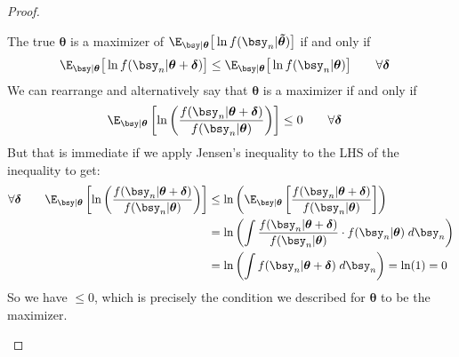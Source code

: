 \documentclass[12pt]{article}
\theoremstyle{plain}
\theoremstyle{definition}
\theoremstyle{remark}
\newcommand{\bstheta}{\boldsymbol{\theta}}
\newcommand{\bsdelta}{\boldsymbol{\delta}}
\newcommand{\bstildetheta}{\boldsymbol{\tilde{\theta}}}
\begin{document}
\begin{proof}
\begin{enumerate}[label=(\roman*)]
    The true $\bstheta$ is a maximizer of
    $\E_{\bsy|\bstheta}\big[\ln f(\bsy_n|\bstildetheta)\big]$ if and
    only if
    \begin{align*}
      \E_{\bsy|\bstheta}\big[\ln f(\bsy_n|\bstheta+\bsdelta)\big]
      &\leq
      \E_{\bsy|\bstheta}\big[\ln f(\bsy_n|\bstheta)\big]
      \qquad\forall \bsdelta
    \end{align*}
    We can rearrange and alternatively say that $\bstheta$ is a
    maximizer if and only if
    \begin{align*}
      \E_{\bsy|\bstheta}\left[
        \ln\left(\frac{f(\bsy_n|\bstheta + \bsdelta)}{f(\bsy_n|\bstheta)}\right)
      \right]
      &\leq 0
      \qquad\forall \bsdelta
    \end{align*}
    But that is immediate if we apply Jensen's inequality to the LHS of
    the inequality to get:
    \begin{align*}
      \forall\bsdelta\qquad
      \E_{\bsy|\bstheta}\left[
        \ln\left(\frac{f(\bsy_n|\bstheta + \bsdelta)}{f(\bsy_n|\bstheta)}\right)
      \right]
      &\leq
      \ln \left(
      \E_{\bsy|\bstheta}\left[
        \frac{f(\bsy_n|\bstheta + \bsdelta)}{f(\bsy_n|\bstheta)}
      \right]
      \right)
      \\
      &=
      \ln \left(
      \int
      \frac{f(\bsy_n|\bstheta + \bsdelta)}{f(\bsy_n|\bstheta)}
      \cdot f(\bsy_n|\bstheta)
      \; d\bsy_n
      \right) \\
      &=
      \ln \left(
      \int
      f(\bsy_n|\bstheta + \bsdelta)
      \; d\bsy_n
      \right)
      = \ln(1) = 0
    \end{align*}
    So we have $\leq 0$, which is precisely the condition we described
    for $\bstheta$ to be the maximizer.


\end{enumerate}
\end{proof}
\end{document}
